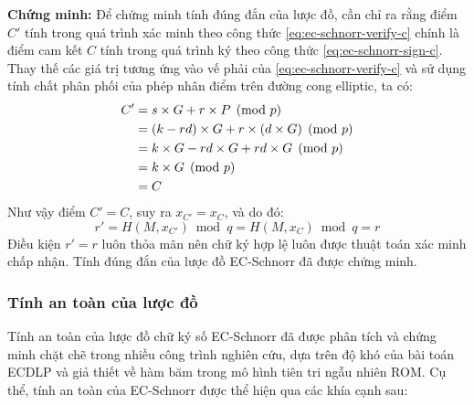 \textbf{Chứng minh:} Để chứng minh tính đúng đắn của lược đồ, cần chỉ ra rằng điểm $C'$ tính trong quá trình xác minh theo công thức \eqref{eq:ec-schnorr-verify-c} chính là điểm cam kết $C$ tính trong quá trình ký theo công thức \eqref{eq:ec-schnorr-sign-c}. Thay thế các giá trị tương ứng vào vế phải của \eqref{eq:ec-schnorr-verify-c} và sử dụng tính chất phân phối của phép nhân điểm trên đường cong elliptic, ta có:
\begin{align}
    C' &= s \times G + r \times P \pmod{p} \notag \\
       &= (k - r d) \times G + r \times (d \times G) \pmod{p} \notag \\
       &= k \times G - r d \times G + r d \times G \pmod{p} \notag \\
       &= k \times G \pmod{p} \notag \\
       &= C
       \label{eq:ec-schnorr-correctness}
\end{align}
Như vậy điểm $C' = C$, suy ra $x_{C'} = x_C$, và do đó:
\begin{equation}
    r' = H(M, x_{C'}) \bmod q = H(M, x_C) \bmod q = r
    \label{eq:ec-schnorr-r-equal}
\end{equation}
Điều kiện $r' = r$ luôn thỏa mãn nên chữ ký hợp lệ luôn được thuật toán xác minh chấp nhận. Tính đúng đắn của lược đồ EC-Schnorr đã được chứng minh.

\subsubsection{Tính an toàn của lược đồ}

Tính an toàn của lược đồ chữ ký số EC-Schnorr đã được phân tích và chứng minh chặt chẽ trong nhiều công trình nghiên cứu, dựa trên độ khó của bài toán ECDLP và giả thiết về hàm băm trong mô hình tiên tri ngẫu nhiên ROM. Cụ thể, tính an toàn của EC-Schnorr được thể hiện qua các khía cạnh sau:

